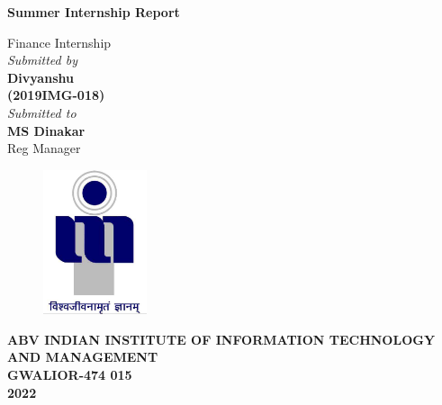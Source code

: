 \title{}
\author{}
\thispagestyle{empty}

\begin{titlepage}
\begin{center}
{\LARGE \bf Summer Internship Report} \\
\end{center}
\begin{center}
\vspace{0.6in}
{\LARGE Finance Internship} \\
\vspace{0.6in}
{\large \it Submitted by\\\vspace{0.1in}}
{\large \bf \vspace{0.2in}Divyanshu\\(2019IMG-018)\\}
\vspace{0.6in}
{\large \it Submitted to\\}
\vspace{0.1in}
{\large \bf MS Dinakar}\\
{\large Reg Manager}\\
\end {center}
\vspace{0.8in}
\begin{figure}[h]
\centerline{\includegraphics[width=1.2in]{./iiitm}}
\end{figure}
\begin{center}
{\Large \bf ABV INDIAN INSTITUTE OF INFORMATION TECHNOLOGY AND MANAGEMENT\\
GWALIOR-474 015\\}
\vspace{0.2in}
{\Large \bf 2022\\}
\end{center}
\end{titlepage}
